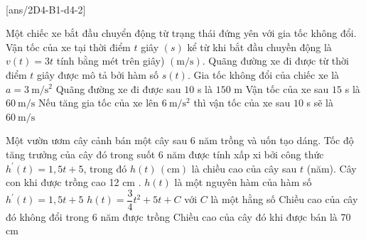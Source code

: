  \\
[ans/2D4-B1-d4-2]

\begin{ex}
	Một chiếc xe bắt đầu chuyển động từ trạng thái đứng yên với gia tốc không đổi. Vận tốc của xe tại thời điểm $t$ giây $(s)$ kể từ khi bắt đầu chuyền động là $v(t)=3 t$ tính bằng mét trên giây) $(\mathrm{m} / \mathrm{s})$. Quãng đường xe đi được từ thời điểm $t$ giây được mô tả bởi hàm số $s(t)$.
	\choiceTF
	{\True Gia tốc không đổi của chiếc xe là $a=3 \mathrm{~m} / \mathrm{s}^2$}
	{\True Quãng đường xe đi được sau $10$ s là $150$ m}
	{Vận tốc của xe sau $15$ s là $60 \mathrm{~m} / \mathrm{s}$}
	{\True Nếu tăng gia tốc của xe lên $6 \mathrm{~m} / \mathrm{s}^2$ thì vận tốc của xe sau $10$ s sẽ là $60 \mathrm{~m} / \mathrm{s}$}
\end{ex}
\begin{ex}
	Một vườn ươm cây cảnh bán một cây sau 6 năm trồng và uốn tạo dáng. Tốc độ tăng trưởng của cây đó trong suốt 6 năm được tính xấp xi bởi công thức $h^{\prime}(t)=1,5 t+5$, trong đó $h(t)\,(\mathrm{cm})$ là chiều cao của cây sau $t$ (năm). Cây con khi được trồng cao 12 cm .
	\choiceTF
	{\True $h(t)$ là một nguyên hàm của hàm số $h^{\prime}(t)=1,5 t+5$}
	{\True $h(t)=\dfrac{3}{4} t^2+5t+C$ với $C$ là một hằng số}
	{Chiều cao của cây đó không đổi trong 6 năm được trồng}
	{Chiều cao của cây đó khi được bán là 70 cm}
\end{ex}
